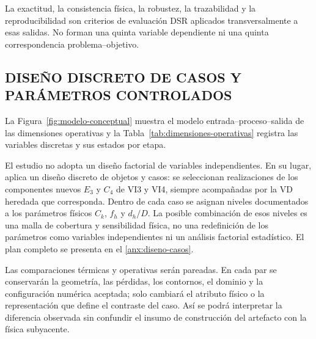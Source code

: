 \documentclass[11pt,a4paper,oneside]{report}
\begin{document}
La exactitud, la consistencia física, la robustez, la trazabilidad y la reproducibilidad son criterios de evaluación DSR aplicados transversalmente a esas salidas. No forman una quinta variable dependiente ni una quinta correspondencia problema--objetivo.

\subsection{DISEÑO DISCRETO DE CASOS Y PARÁMETROS CONTROLADOS}

La Figura~\ref{fig:modelo-conceptual} muestra el modelo entrada--proceso--salida de las dimensiones operativas y la Tabla~\ref{tab:dimensiones-operativas} registra las variables discretas y sus estados por etapa.

El estudio no adopta un diseño factorial de variables independientes. En su lugar, aplica un diseño discreto de objetos y casos: se seleccionan realizaciones de los componentes nuevos $E_3$ y $C_4$ de VI3 y VI4, siempre acompañadas por la VD heredada que corresponda. Dentro de cada caso se asignan niveles documentados a los parámetros físicos $C_k$, $f_h$ y $d_h/D$. La posible combinación de esos niveles es una malla de cobertura y sensibilidad física, no una redefinición de los parámetros como variables independientes ni un análisis factorial estadístico. El plan completo se presenta en el \ref{anx:diseno-casos}.

Las comparaciones térmicas y operativas serán pareadas. En cada par se conservarán la geometría, las pérdidas, los contornos, el dominio y la configuración numérica aceptada; solo cambiará el atributo físico o la representación que define el contraste del caso. Así se podrá interpretar la diferencia observada sin confundir el insumo de construcción del artefacto con la física subyacente.
\end{document}
